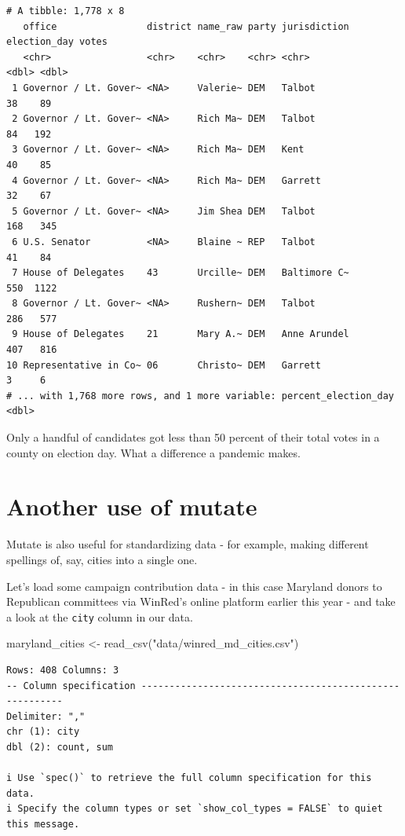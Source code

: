 \documentclass[
  letterpaper,
  DIV=11,
  numbers=noendperiod]{scrreprt}
\newenvironment{Shaded}{\begin{snugshade}}{\end{snugshade}}
\newcommand{\FunctionTok}[1]{\textcolor[rgb]{0.28,0.35,0.67}{#1}}
\newcommand{\NormalTok}[1]{\textcolor[rgb]{0.00,0.23,0.31}{#1}}
\newcommand{\OtherTok}[1]{\textcolor[rgb]{0.00,0.23,0.31}{#1}}
\newcommand{\StringTok}[1]{\textcolor[rgb]{0.13,0.47,0.30}{#1}}
\begin{document}
\begin{verbatim}
# A tibble: 1,778 x 8
   office                district name_raw party jurisdiction election_day votes
   <chr>                 <chr>    <chr>    <chr> <chr>               <dbl> <dbl>
 1 Governor / Lt. Gover~ <NA>     Valerie~ DEM   Talbot                 38    89
 2 Governor / Lt. Gover~ <NA>     Rich Ma~ DEM   Talbot                 84   192
 3 Governor / Lt. Gover~ <NA>     Rich Ma~ DEM   Kent                   40    85
 4 Governor / Lt. Gover~ <NA>     Rich Ma~ DEM   Garrett                32    67
 5 Governor / Lt. Gover~ <NA>     Jim Shea DEM   Talbot                168   345
 6 U.S. Senator          <NA>     Blaine ~ REP   Talbot                 41    84
 7 House of Delegates    43       Urcille~ DEM   Baltimore C~          550  1122
 8 Governor / Lt. Gover~ <NA>     Rushern~ DEM   Talbot                286   577
 9 House of Delegates    21       Mary A.~ DEM   Anne Arundel          407   816
10 Representative in Co~ 06       Christo~ DEM   Garrett                 3     6
# ... with 1,768 more rows, and 1 more variable: percent_election_day <dbl>
\end{verbatim}

Only a handful of candidates got less than 50 percent of their total
votes in a county on election day. What a difference a pandemic makes.

\hypertarget{another-use-of-mutate}{%
\section{Another use of mutate}\label{another-use-of-mutate}}

Mutate is also useful for standardizing data - for example, making
different spellings of, say, cities into a single one.

Let's load some campaign contribution data - in this case Maryland
donors to Republican committees via WinRed's online platform earlier
this year - and take a look at the \texttt{city} column in our data.

\begin{Shaded}
\begin{Highlighting}[]
\NormalTok{maryland\_cities }\OtherTok{\textless{}{-}} \FunctionTok{read\_csv}\NormalTok{(}\StringTok{"data/winred\_md\_cities.csv"}\NormalTok{)}
\end{Highlighting}
\end{Shaded}

\begin{verbatim}
Rows: 408 Columns: 3
-- Column specification --------------------------------------------------------
Delimiter: ","
chr (1): city
dbl (2): count, sum

i Use `spec()` to retrieve the full column specification for this data.
i Specify the column types or set `show_col_types = FALSE` to quiet this message.
\end{verbatim}
\end{document}
